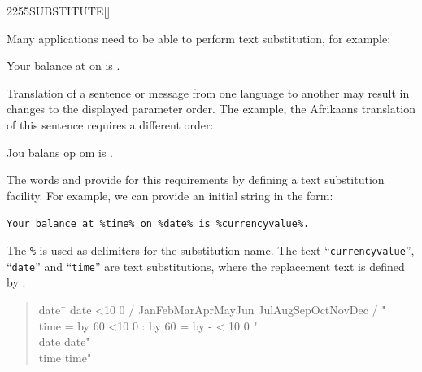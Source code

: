 \begin{worddef}{2255}{SUBSTITUTE}[]

	\begin{rationale} %
		Many applications need to be able to perform text substitution, for
		example:

		\begin{center}
			 Your balance at  on  is .
		\end{center}

		Translation of a sentence or message from one language to another may
		result in changes to the displayed parameter order.  The example, the
		Afrikaans translation of this sentence requires a different order:

		\begin{center}
			Jou balans op  om  is .
		\end{center}

		The words  and  provide for this
		requirements by defining a text substitution facility.  For example,
		we can provide an initial string in the form:

		\begin{center}
			\texttt{Your balance at \%time\% on \%date\% is \%currencyvalue\%.}
		\end{center}

		The \texttt{\%} is used as delimiters for the substitution name.  The
		text ``\texttt{currencyvalue}'', ``\texttt{date}'' and ``\texttt{time}''
		are text substitutions, where the replacement text is defined by
		:

\makeatletter
\newcommand{\ptime}{%
	\@tempcnta = \time
	\divide\@tempcnta by 60
	\ifnum\@tempcnta<10 0\fi%
	\number\@tempcnta%
	:%
	\multiply\@tempcnta by 60
	\@tempcntb = \time
	\advance\@tempcntb by -\@tempcnta
	\ifnum\@tempcntb < 10 0\fi%
	\number\@tempcntb
}

\newcommand{\pdate}{%
	\ifnum\day<10 0\fi%
	\number\day%
	/%
	\ifcase\month
	\or Jan\or Feb\or Mar\or Apr\or May\or Jun
	\or Jul\or Aug\or Sep\or Oct\or Nov\or Dec\fi%
	/%
	\number\year
}
\makeatother

		\begin{quote}\ttfamily
			\begin{tabbing}
				date\ \= \kill
				\word{:} date  \pdate" \word{;} \\
				\word{:} time  \ptime" \word{;} \\
				date \>  date" \word{REPLACES} \ \>  time" 
			\end{tabbing}
		\end{quote}


\end{rationale}
\end{worddef}
